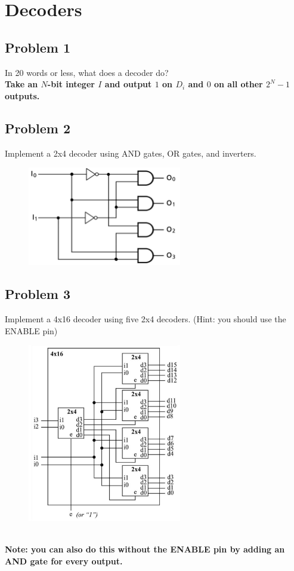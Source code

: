 \documentclass{article}
\begin{document}
\newpage
\section*{Decoders}
\subsection*{Problem 1}
In 20 words or less, what does a decoder do?\\
\textbf{Take an $N$-bit integer $I$ and output $1$ on $D_i$ and $0$ on all other $2^N-1$ outputs.}

\subsection*{Problem 2}
Implement a 2x4 decoder using AND gates, OR gates, and inverters.
\begin{figure}[!h]
    \centering
    \includegraphics[width=0.6\textwidth]{figures/decoder2_solution.png}
\end{figure}
\newpage
\subsection*{Problem 3}
Implement a 4x16 decoder using five 2x4 decoders. (Hint: you should use the ENABLE pin)
\begin{figure}[!h]
    \centering
    \includegraphics[width=0.6\textwidth]{figures/decoder3_solution.png}
\end{figure}
\\ \textbf{Note: you can also do this without the ENABLE pin by adding an AND gate for every output.}
\end{document}

